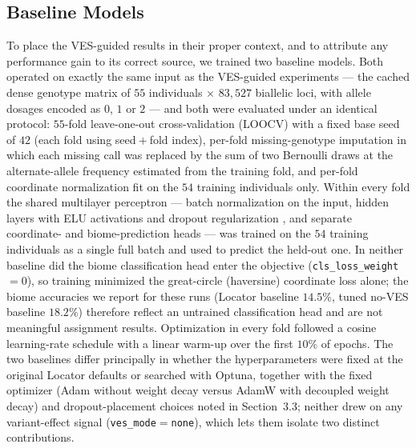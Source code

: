 \documentclass[twocolumn,10pt]{article}
\begin{document}
\subsection{Baseline Models}
To place the VES-guided results in their proper context, and to attribute any performance gain to
its correct source, we trained two baseline models. Both operated on exactly the same input as the
VES-guided experiments --- the cached dense genotype matrix of $55$ individuals $\times$ $83{,}527$
biallelic loci, with allele dosages encoded as $0$, $1$ or $2$ --- and both were evaluated under an
identical protocol: $55$-fold leave-one-out cross-validation (LOOCV) with a fixed base seed of $42$
(each fold using seed${}+{}$fold index), per-fold missing-genotype imputation in which each missing
call was replaced by the sum of two Bernoulli draws at the alternate-allele frequency estimated from
the training fold, and per-fold coordinate normalization fit on the $54$ training individuals only.
Within every fold the shared multilayer perceptron --- batch normalization on the input, hidden
layers with ELU activations and dropout regularization \citep{srivastava2014dropout}, and separate
coordinate- and biome-prediction heads --- was trained on the $54$ training individuals as a single
full batch and used to predict the held-out one. In neither baseline did the biome classification
head enter the objective (\texttt{cls\_loss\_weight}${}=0$), so training minimized the great-circle
(haversine) coordinate loss alone; the biome accuracies we report for these runs (Locator baseline
$14.5\%$, tuned no-VES baseline $18.2\%$) therefore reflect an untrained classification head and are
not meaningful assignment results. Optimization in every fold followed a cosine learning-rate
schedule with a linear warm-up over the first $10\%$ of epochs. The two baselines differ principally
in whether the hyperparameters were fixed at the original Locator defaults or searched with Optuna,
together with the fixed optimizer (Adam without weight decay versus AdamW with decoupled weight
decay) and dropout-placement choices noted in Section~3.3; neither drew on any variant-effect signal
(\texttt{ves\_mode}${}=$\texttt{none}), which lets them isolate two distinct contributions.
\end{document}
